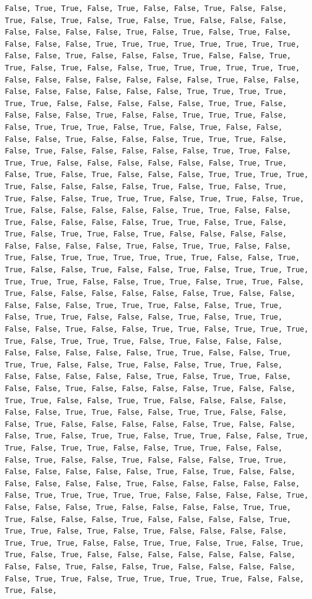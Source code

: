\documentclass[
  letterpaper,
  DIV=11,
  numbers=noendperiod]{scrartcl}
\begin{document}
\begin{verbatim}
False, True, True, False, True, False, False, True, False, False, True, False, True, False, True, False, True, False, False, False, False, False, False, False, True, False, True, False, True, False, False, False, False, True, True, True, True, True, True, True, True, False, False, True, False, False, False, True, False, False, True, True, False, True, False, False, True, True, True, True, True, True, False, False, False, False, False, False, False, True, False, False, False, False, False, False, False, False, True, True, True, True, True, True, False, False, False, False, False, True, True, False, False, False, False, True, False, False, True, True, True, False, False, True, True, True, False, True, False, True, False, False, False, False, True, False, False, False, True, True, True, False, False, True, False, False, False, False, False, True, True, False, True, True, False, False, False, False, False, False, True, True, False, True, False, True, False, False, False, True, True, True, True, True, False, False, False, False, True, False, True, False, True, True, False, False, True, True, True, False, True, True, False, True, True, False, False, False, False, False, True, True, False, False, True, False, False, False, False, True, True, False, True, False, True, False, True, True, False, True, False, False, False, False, False, False, False, False, True, False, True, True, False, False, True, False, True, True, True, True, True, True, False, False, True, True, False, False, True, False, False, True, False, True, True, True, True, True, True, False, False, True, True, False, True, True, False, True, False, False, False, False, False, False, True, False, False, False, False, False, True, True, True, False, False, True, True, False, True, True, False, False, False, True, False, True, True, False, False, True, False, False, True, True, False, True, True, True, True, False, True, True, True, False, True, False, False, False, False, False, False, False, False, True, True, False, False, True, True, True, False, False, True, False, False, True, True, False, False, False, False, False, False, True, False, True, True, False, False, False, True, False, False, False, False, True, False, False, True, True, False, False, True, True, False, False, False, False, False, False, True, True, False, False, True, True, False, False, False, True, False, False, False, False, False, True, False, False, False, True, False, True, True, False, True, True, False, False, True, True, False, True, True, False, False, True, True, False, False, False, True, False, False, True, False, False, False, True, True, False, False, False, False, False, True, False, True, False, False, False, False, False, False, True, False, False, False, False, False, False, True, True, True, True, True, False, False, False, False, True, False, False, False, True, False, False, False, False, True, True, True, False, False, False, True, False, False, False, False, True, True, True, False, True, False, True, False, False, False, False, True, True, True, False, False, True, True, False, True, False, True, True, False, True, False, False, False, False, False, False, False, False, False, True, False, False, True, False, False, False, False, False, True, True, False, True, True, True, True, True, False, False, True, False, 
\end{verbatim}
\end{document}
